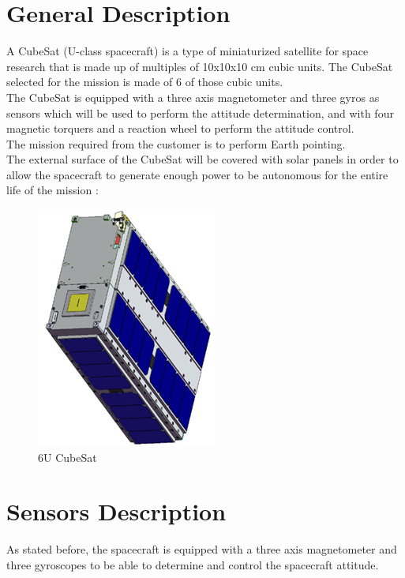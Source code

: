 \documentclass[11pt,a4paper]{report}
\begin{document}
\section{General Description}
A CubeSat (U-class spacecraft) is a type of miniaturized satellite for space research that is made up of multiples of 10x10x10 cm cubic units. The CubeSat selected for the mission is made of 6 of those cubic units. \\
The CubeSat is equipped with a three axis magnetometer and three gyros as sensors which will be used to perform the attitude determination, and with four magnetic torquers and a reaction wheel to perform the attitude control.\\
The mission required from the customer is to perform Earth pointing.\\
The external surface of the CubeSat will be covered with solar panels in order to allow the spacecraft to generate enough power to be autonomous for the entire life of the mission : 

\begin{figure}[H]
 	\centering
 	\includegraphics[scale=0.4]{gfx/cubesat_panels.jpg}
    \caption{6U CubeSat}
\end{figure}

\section{Sensors Description}
As stated before, the spacecraft is equipped with a three axis magnetometer and three gyroscopes to be able to determine and control the spacecraft attitude.
\end{document}
